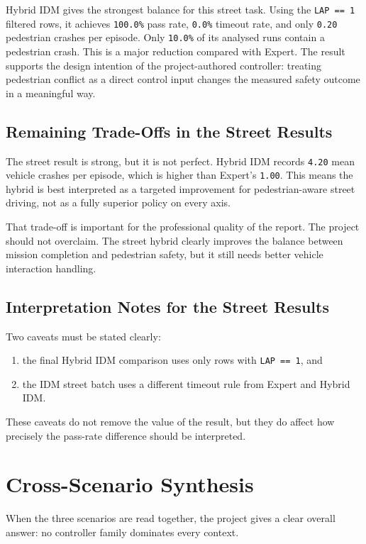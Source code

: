 \documentclass[12pt,a4paper]{report}
\begin{document}
Hybrid IDM gives the strongest balance for this street task. Using the \texttt{LAP == 1} filtered rows, it achieves \texttt{100.0\%} pass rate, \texttt{0.0\%} timeout rate, and only \texttt{0.20} pedestrian crashes per episode. Only \texttt{10.0\%} of its analysed runs contain a pedestrian crash. This is a major reduction compared with Expert. The result supports the design intention of the project-authored controller: treating pedestrian conflict as a direct control input changes the measured safety outcome in a meaningful way.

\subsection{Remaining Trade-Offs in the Street Results}
The street result is strong, but it is not perfect. Hybrid IDM records \texttt{4.20} mean vehicle crashes per episode, which is higher than Expert's \texttt{1.00}. This means the hybrid is best interpreted as a targeted improvement for pedestrian-aware street driving, not as a fully superior policy on every axis.

That trade-off is important for the professional quality of the report. The project should not overclaim. The street hybrid clearly improves the balance between mission completion and pedestrian safety, but it still needs better vehicle interaction handling.

\subsection{Interpretation Notes for the Street Results}
Two caveats must be stated clearly:

\begin{enumerate}[label=\arabic*.]
    \item the final Hybrid IDM comparison uses only rows with \texttt{LAP == 1}, and
    \item the IDM street batch uses a different timeout rule from Expert and Hybrid IDM.
\end{enumerate}

These caveats do not remove the value of the result, but they do affect how precisely the pass-rate difference should be interpreted.

\section{Cross-Scenario Synthesis}
When the three scenarios are read together, the project gives a clear overall answer: no controller family dominates every context.
\end{document}
